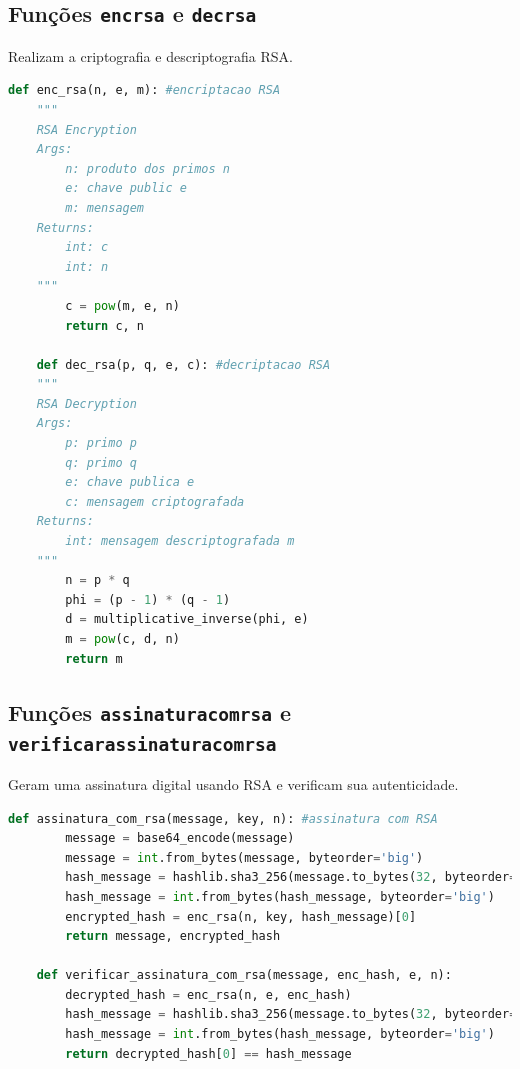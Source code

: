 \documentclass{article}
\begin{document}
\vspace*{8 cm}

\subsection{Funções \texttt{enc\textunderscore rsa} e \texttt{dec\textunderscore rsa}}
Realizam a criptografia e descriptografia RSA.

\begin{lstlisting}[language=Python]
    def enc_rsa(n, e, m): #encriptacao RSA
    """
    RSA Encryption
    Args:
        n: produto dos primos n
        e: chave public e
        m: mensagem
    Returns:
        int: c
        int: n
    """
        c = pow(m, e, n)
        return c, n

    def dec_rsa(p, q, e, c): #decriptacao RSA
    """
    RSA Decryption
    Args:
        p: primo p
        q: primo q
        e: chave publica e
        c: mensagem criptografada
    Returns:
        int: mensagem descriptografada m
    """
        n = p * q
        phi = (p - 1) * (q - 1)
        d = multiplicative_inverse(phi, e)
        m = pow(c, d, n)
        return m
    \end{lstlisting}

\subsection{Funções \texttt{assinatura\textunderscore com\textunderscore rsa} e \texttt{verificar\textunderscore assinatura\textunderscore com\textunderscore rsa}}
Geram uma assinatura digital usando RSA e verificam sua autenticidade.

\begin{lstlisting}[language=Python]
    def assinatura_com_rsa(message, key, n): #assinatura com RSA
        message = base64_encode(message)
        message = int.from_bytes(message, byteorder='big')
        hash_message = hashlib.sha3_256(message.to_bytes(32, byteorder='big')).digest()
        hash_message = int.from_bytes(hash_message, byteorder='big')
        encrypted_hash = enc_rsa(n, key, hash_message)[0]
        return message, encrypted_hash

    def verificar_assinatura_com_rsa(message, enc_hash, e, n):
        decrypted_hash = enc_rsa(n, e, enc_hash)
        hash_message = hashlib.sha3_256(message.to_bytes(32, byteorder='big')).digest()
        hash_message = int.from_bytes(hash_message, byteorder='big')
        return decrypted_hash[0] == hash_message
    \end{lstlisting}
\end{document}
